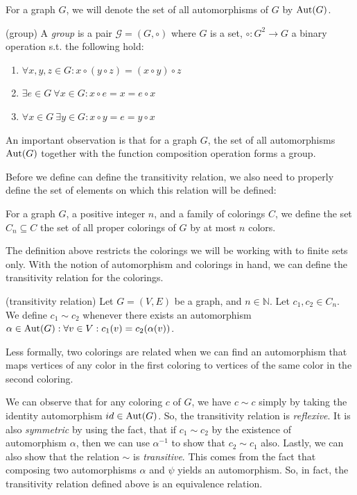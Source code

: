 For a graph $G$, we will denote the set of all automorphisms of $G$ by $\operatorname{Aut}(G)$.

\begin{defn}(group)
    A \emph{group} is a pair $\mathcal{G}=(G,\circ)$ where $G$ is a set, $\circ:G^2 \rightarrow G$ a binary operation s.t. the following hold:
    \begin{enumerate}
        \item $\forall x,y,z \in G : x \circ (y \circ z) = ( x \circ y ) \circ z$
        \item $\exists e \in G \ \forall x \in G :x \circ e = x = e \circ x$
        \item $ \forall x \in G \ \exists y \in G : x \circ y = e = y \circ x$
    \end{enumerate}
\end{defn}

An important observation is that for a graph $G$, the set of all automorphisms $\operatorname{Aut}(G)$ together with the function composition operation forms a group. 

Before we define can define the transitivity relation, we also need to properly define the set of elements on which this relation will be defined:

\begin{defn}
    For a graph $G$, a positive integer $n$, and a family of colorings $C$, we define the set $C_n \subseteq C$ the set of all proper colorings of $G$ by at most $n$ colors.
\end{defn}

The definition above restricts the colorings we will be working with to finite sets only. With the notion of automorphism and colorings in hand, we can define the transitivity relation for the colorings.

\begin{defn}(transitivity relation)
        Let $G=(V,E)$ be a graph, and $n\in \mathbb{N}$. Let $c_1,c_2 \in C_n$. We define $c_1 \sim c_2$ whenever there exists an automorphism $\alpha \in \operatorname{Aut}(G) : \forall v \in V : c_1(v)=c_2(\alpha(v))$.
\end{defn}

Less formally, two colorings are related when we can find an automorphism that maps vertices of any color in the first coloring to vertices of the same color in the second coloring. 

We can observe that for any coloring $c$ of $G$, we have $c \sim c$ simply by taking the identity automorphism $id \in \operatorname{Aut}(G)$. So, the transitivity relation is \textit{reflexive}. It is also \textit{symmetric} by using the fact, that if $c_1 \sim c_2$ by the existence of automorphism $\alpha$, then we can use $\alpha^{-1}$ to show that $c_2 \sim c_1$ also. Lastly, we can also show that the relation $\sim$ is \textit{transitive}. This comes from the fact that composing two automorphisms $\alpha$ and $\psi$ yields an automorphism. So, in fact, the transitivity relation defined above is an equivalence relation.

